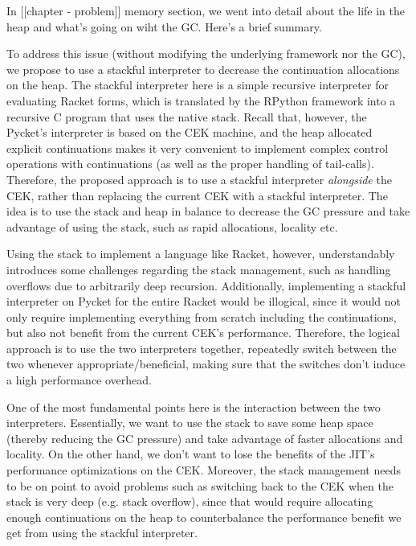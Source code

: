     \begin{paragraph-here}
       In [[chapter - problem]] memory section, we went into detail about the life in the heap and what's going on wiht the GC. Here's a brief summary.
    \end{paragraph-here}

    \begin{paragraph-here}
      To address this issue (without modifying the underlying framework nor the GC), we propose to use a stackful interpreter to decrease the continuation allocations on the heap. The stackful interpreter here is a simple recursive interpreter for evaluating Racket forms, which is translated by the RPython framework into a recursive C program that uses the native stack. Recall that, however, the Pycket's interpreter is based on the CEK machine, and the heap allocated explicit continuations makes it very convenient to implement complex control operations with continuations (as well as the proper handling of tail-calls). Therefore, the proposed approach is to use a stackful interpreter \emph{alongside} the CEK, rather than replacing the current CEK with a stackful interpreter. The idea is to use the stack and heap in balance to decrease the GC pressure and take advantage of using the stack, such as rapid allocations, locality etc.
    \end{paragraph-here}

    \begin{paragraph-here}
      Using the stack to implement a language like Racket, however, understandably introduces some challenges regarding the stack management, such as handling overflows due to arbitrarily deep recursion. Additionally, implementing a stackful interpreter on Pycket for the entire Racket would be illogical, since it would not only
    require implementing everything from scratch including the
    continuations, but also not benefit from the current CEK's
    performance. Therefore, the logical approach is to use the two
    interpreters together, repeatedly switch between the two whenever
    appropriate/beneficial, making sure that the switches don't induce a high
    performance overhead.
    \end{paragraph-here}

    \begin{paragraph-here}
        One of the most fundamental points here is the interaction between the
      two interpreters. Essentially, we want to use the stack to save some
      heap space (thereby reducing the GC pressure) and take advantage of
      faster allocations and locality. On the other hand, we don't want to
      lose the benefits of the JIT's performance optimizations on the
      CEK. Moreover, the stack management needs to be on point to avoid
      problems such as switching back to the CEK when the stack is very deep
      (e.g. stack overflow), since that would require allocating enough
      continuations on the heap to counterbalance the performance benefit we
      get from using the stackful interpreter.
    \end{paragraph-here}

